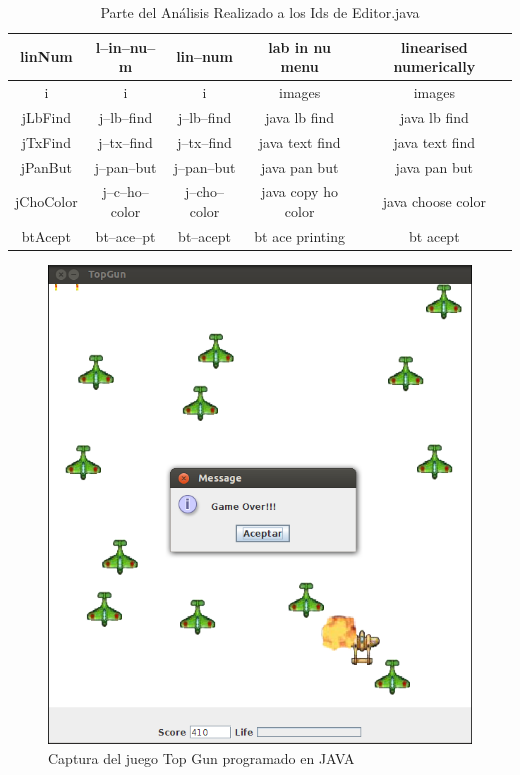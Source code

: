 \begin{table}
\begin{tabular}{| c | c | c | c | c |}
linNum&l--in--nu--m&lin--num&lab in nu menu&linearised numerically\\ \hline
i&i&i&images&images\\ \hline
jLbFind&j--lb--find&j--lb--find&java lb find&java lb find\\ \hline
jTxFind&j--tx--find&j--tx--find&java text find&java text find\\ \hline
jPanBut&j--pan--but&j--pan--but&java pan but&java pan but\\ \hline
jChoColor&j--c--ho--color&j--cho--color&java copy ho color&java choose color\\ \hline
btAcept&bt--ace--pt&bt--acept&bt ace printing&bt acept\\ \hline

  \end{tabular}
	 
   \caption{Parte del Análisis Realizado a los Ids de Editor.java}
   \label{tabla6}
     
\end{table}

\clearpage %


\begin{figure}[t!] %
\centerline{%
\includegraphics[scale= 0.72]{./cap5/caso_03.png}
}
\caption{Captura del juego Top Gun programado en JAVA}
\label{caso3}
\end{figure}


